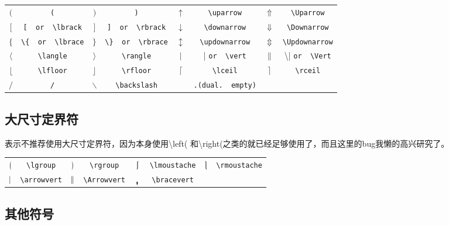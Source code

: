 \begin{table}[H]
\centering
\begin{tabular}{*{8}{c}}
$(  $  &  \verb|(|  &$  )$  &  \verb|)|  &$\uparrow  $  &  \verb|\uparrow|  &$\Uparrow  $  &  \verb|\Uparrow|\\
$  [$  &  \verb|[  or  \lbrack|  &$  ]$  &  \verb|]  or  \rbrack|  &$  \downarrow$  &  \verb|\downarrow|  &$  \Downarrow$  &  \verb|\Downarrow|  \\
$\{  $  &  \verb|\{  or  \lbrace|  &$\}$  &  \verb|\}  or  \rbrace|  &$\updownarrow  $  &  \verb|\updownarrow|  &$  \Updownarrow$  &  \verb|\Updownarrow|  \\
$\langle  $  &  \verb|\langle|  &$\rangle  $  &  \verb|\rangle|  &$|  $  &  |  \verb|or  \vert|  &$\|  $  &  \textbackslash  |  \verb|or  \Vert|  \\
$\lfloor  $  &  \verb|\lfloor|  &$\rfloor  $  &  \verb|\rfloor|  &$\lceil  $  &  \verb|\lceil|  &$\rceil  $  &  \verb|\rceil|  \\
$/  $  &  \verb|/|  &$\backslash  $  &  \verb|\backslash|  &$  $  &  \verb|.(dual.  empty)|  &  &  
\end{tabular}
\end{table}

\subsection{大尺寸定界符}
\song 表示不推荐使用大尺寸定界符，因为本身使用\textbackslash left( 和\textbackslash right(之类的就已经足够使用了，而且这里的bug我懒的高兴研究了。
\begin{table}[H]
\centering
\begin{tabular}{*{8}{c}}
$\lgroup  $  &  \verb|\lgroup|  &$\rgroup  $  &  \verb|\rgroup|  &$\lmoustache  $  &  \verb|\lmoustache|  &$  \rmoustache$  &  \verb|\rmoustache|  \\
$\arrowvert  $  &  \verb|\arrowvert|  &$\Arrowvert  $  &  \verb|\Arrowvert|  &$\bracevert  $  &  \verb|\bracevert|  &  &
\end{tabular}
\end{table}

\subsection{其他符号}

